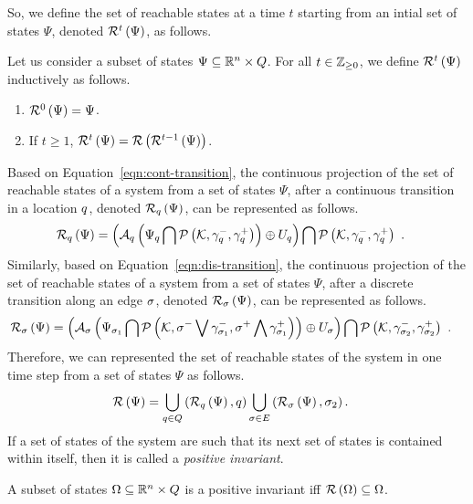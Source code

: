 %
So, we define the set of reachable states at a time $t$ starting from an intial
set of states $\Psi$, denoted $\mathcal{R}^{t}\left(\Psi\right)$, as
follows.
%
\begin{definition}
Let us consider a subset of states
$\Psi\subseteq\mathbb{R}^n\times Q$.  For all $t\in\mathbb{Z}_{\geq
0}$, we define $\mathcal{R}^{t}\left(\Psi\right)$ inductively as follows.
%
\begin{enumerate}
\item $\mathcal{R}^{0}\left(\Psi\right)=\Psi$.
\item If $t\geq 1$, $\mathcal{R}^{t}\left(\Psi\right)=\mathcal{R}\left(\mathcal{R}^{t-1}\left(\Psi\right)\right)$.
\end{enumerate}
%
\end{definition}
%
Based on Equation~\ref{eqn:cont-transition}, the continuous projection
of the set of reachable states of a system from a set of
states $\Psi$, after a continuous transition in a location $q$,
denoted $\mathcal{R}_{q}\left(\Psi\right)$, can be represented as follows.
%
\begin{align}
&
\mathcal{R}_{q}\left(\Psi\right)=\left(\mathcal{A}_q\left(\Psi_q\bigcap{\mathcal{P}\left(\mathcal{K},\gamma_q^-,\gamma_q^+\right)}\right)\oplus U_q\right)\bigcap
\mathcal{P}\left(\mathcal{K},\gamma_q^-,\gamma_q^+\right)~\label{eqn:contreach}.
\end{align}
%
Similarly, based on Equation~\ref{eqn:dis-transition}, the continuous
projection of the set of reachable states of a system from a set of
states $\Psi$, after a discrete transition along an edge $\sigma$,
denoted $\mathcal{R}_{\sigma}\left(\Psi\right)$, can be represented as follows.
%
\begin{align}
&
\mathcal{R}_{\sigma}\left(\Psi\right)=\left(\mathcal{A}_\sigma\left(\Psi_{\sigma_1}\bigcap\mathcal{P}\left(\mathcal{K},\sigma^-\bigvee \gamma_{\sigma_1}^-,\sigma^+\bigwedge \gamma_{\sigma_1}^+\right)\right)\oplus U_{\sigma}\right)\bigcap 
\mathcal{P}\left(\mathcal{K},\gamma_{\sigma_2}^-,\gamma_{\sigma_2}^+\right)~\label{eqn:disreach}.
\end{align}
%
Therefore, we can represented the set of reachable states of the
system in one time step from a set of states $\Psi$ as follows.
%
\begin{align*}
& \mathcal{R}\left(\Psi\right)=\bigcup_{q\in Q}\left(\mathcal{R}_{q}\left(\Psi\right),q\right)\bigcup_{\sigma\in E}\left(\mathcal{R}_{\sigma}\left(\Psi\right),\sigma_2\right).
\end{align*}
%
If a set of states of the system are such that its next set of states
is contained within itself, then it is called a {\it positive invariant}.
%
\begin{definition}
A subset of states $\Omega\subseteq\mathbb{R}^n\times Q$ is a
positive invariant iff $\mathcal{R}\left(\Omega\right)\subseteq\Omega$.
\end{definition}
